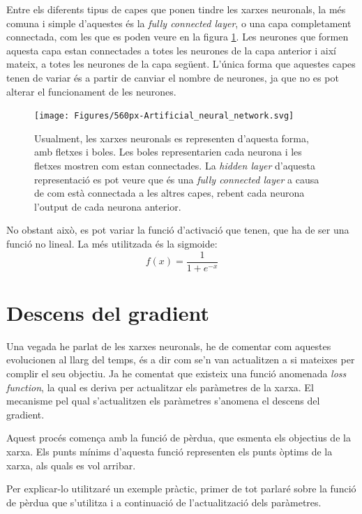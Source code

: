 Entre els diferents tipus de capes que ponen tindre les xarxes neuronals, la més comuna i simple d'aquestes és la \textit{fully connected layer}, o una capa completament connectada, com les que es poden veure en la figura \ref{fig:560px-artificialneuralnetwork}. Les neurones que formen aquesta capa estan connectades a totes les neurones de la capa anterior i així mateix, a totes les neurones de la capa següent. L'única forma que aquestes capes tenen de variar és a partir de canviar el nombre de neurones, ja que no es pot alterar el funcionament de les neurones.
\begin{figure}[H]
	\centering
	\texttt{[image: Figures/560px-Artificial\_neural\_network.svg]}
	\caption{Usualment, les xarxes neuronals es representen d'aquesta forma, amb fletxes i boles. Les boles representarien cada neurona i les fletxes mostren com estan connectades. La \textit{hidden layer} d'aquesta representació es pot veure que és una \textit{fully connected layer} a causa de com està connectada a les altres capes, rebent cada neurona l'output de cada neurona anterior.}
	\label{fig:560px-artificialneuralnetwork}
\end{figure}
No obstant això, es pot variar la funció d'activació que tenen, que ha de ser una funció no lineal. La més utilitzada és la sigmoide:
$$
f(x) = \frac{1}{1+e^{-x}}
$$

\section{Descens del gradient}
Una vegada he parlat de les xarxes neuronals, he de comentar com aquestes evolucionen al llarg del temps, és a dir com se'n van actualitzen a si mateixes per complir el seu objectiu. Ja he comentat que existeix una funció anomenada \textit{loss function}, la qual es deriva per actualitzar els paràmetres de la xarxa. El mecanisme pel qual s'actualitzen els paràmetres s'anomena el descens del gradient.

Aquest procés comença amb la funció de pèrdua, que esmenta els objectius de la xarxa. Els punts mínims d'aquesta funció representen els punts òptims de la xarxa, als quals es vol arribar. 

 Per explicar-lo utilitzaré un exemple pràctic, primer de tot parlaré sobre la funció de pèrdua que s'utilitza i a continuació de l'actualització dels paràmetres. 
 
